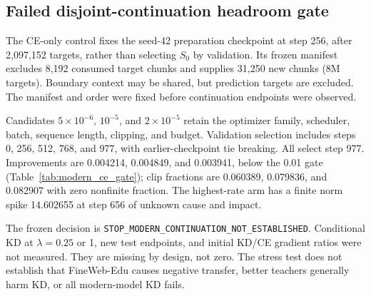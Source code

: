 \subsection{Failed disjoint-continuation headroom gate}
The CE-only control fixes the seed-42 preparation checkpoint at step 256, after 2,097,152 targets, rather than selecting $S_0$ by validation. Its frozen manifest excludes 8,192 consumed target chunks and supplies 31,250 new chunks (8M targets). Boundary context may be shared, but prediction targets are excluded. The manifest and order were fixed before continuation endpoints were observed.

Candidates $5\times10^{-6}$, $10^{-5}$, and $2\times10^{-5}$ retain the optimizer family, scheduler, batch, sequence length, clipping, and budget. Validation selection includes steps 0, 256, 512, 768, and 977, with earlier-checkpoint tie breaking. All select step 977. Improvements are 0.004214, 0.004849, and 0.003941, below the 0.01 gate (Table~\ref{tab:modern_ce_gate}); clip fractions are 0.060389, 0.079836, and 0.082907 with zero nonfinite fraction. The highest-rate arm has a finite norm spike 14.602655 at step 656 of unknown cause and impact.

The frozen decision is
\texttt{STOP\_}\allowbreak\texttt{MODERN\_}\allowbreak\texttt{CONTINUATION\_}\allowbreak\texttt{NOT\_}\allowbreak\texttt{ESTABLISHED}.
Conditional KD at $\lambda=0.25$ or 1, new test endpoints, and initial KD/CE gradient ratios were not measured. They are missing by design, not zero. The stress test does not establish that FineWeb-Edu causes negative transfer, better teachers generally harm KD, or all modern-model KD fails.

